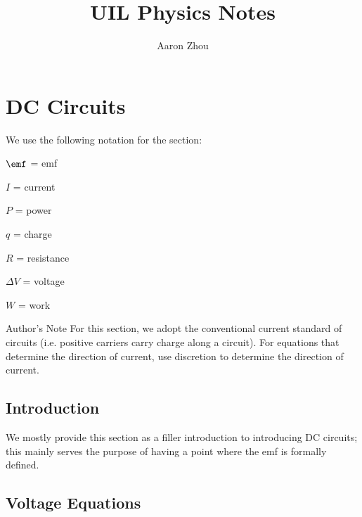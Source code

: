 \documentclass{article}
\title{UIL Physics Notes}
\author{Aaron Zhou}
\begin{document}
\maketitle

{
    \hypersetup{linkcolor=black}
    \tableofcontents
}

\newpage
\section{DC Circuits}

We use the following notation for the section: 

\vspace{15px}

\begin{tcolorbox}
\begin{multicols}{4}
\begin{description}
    \item $\emf$ = emf
    \item $I$ = current
    \item $P$ = power
    \item $q$ = charge
    \item $R$ = resistance
    \item $\Delta V$ = voltage
    \item $W$ = work
\end{description}
\end{multicols}
\end{tcolorbox}

\begin{textbox}{Author's Note}
    For this section, we adopt the conventional current standard of circuits (i.e. positive carriers carry charge along a circuit). For equations that determine the direction of current, use discretion to determine the direction of current. 
\end{textbox}

\subsection*{Introduction}
We mostly provide this section as a filler introduction to introducing DC circuits; this mainly serves the purpose of having a point where the emf is formally defined.

\subsection{Voltage Equations}
\end{document}
